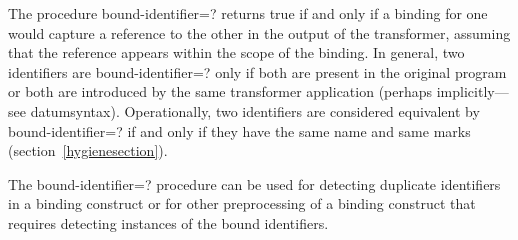 \begin{entry}{%
}

The procedure {\cf bound-identifier=?} returns true if and only if a
binding for one would capture a reference to the other in the output of
the transformer, assuming that the reference appears within the scope of
the binding.
In general, two identifiers are {\cf bound-identifier=?} only if
both are present in the original program or both are introduced by the
same transformer application
(perhaps implicitly---see {\cf datum\coerce{}syntax}).
Operationally, two identifiers are
considered equivalent by {\cf bound-identifier=?} if and only if they
have the same name and same marks (section~\ref{hygienesection}).

The {\cf bound-identifier=?} procedure can be used for detecting
duplicate identifiers in a binding construct or for other
preprocessing of a binding construct that requires detecting instances
of the bound identifiers.
\end{entry}

